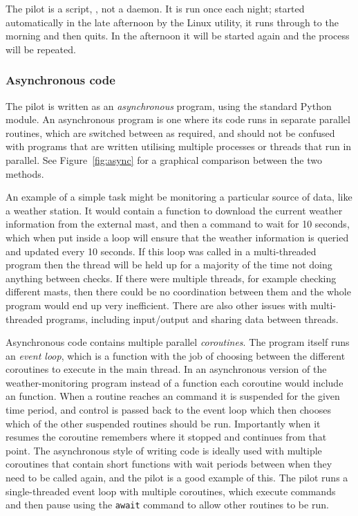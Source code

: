 \begin{colsection}
\begin{colsection}
The pilot is a  script, , not a daemon. It is run once each night; started automatically in the late afternoon by the Linux  utility, it runs through to the morning and then quits. In the afternoon it will be started again and the process will be repeated.

\subsubsection{Asynchronous code}

The pilot is written as an \textit{asynchronous} program, using the standard Python  module. An asynchronous program is one where its code runs in separate parallel routines, which are switched between as required, and should not be confused with programs that are written utilising multiple processes or threads that run in parallel. See Figure~\ref{fig:async} for a graphical comparison between the two methods.

An example of a simple task might be monitoring a particular source of data, like a weather station. It would contain a function to download the current weather information from the external mast, and then a  command to wait for 10 seconds, which when put inside a loop will ensure that the weather information is queried and updated every 10 seconds. If this loop was called in a multi-threaded program then the thread will be held up for a majority of the time not doing anything between checks. If there were multiple threads, for example checking different masts, then there could be no coordination between them and the whole program would end up very inefficient. There are also other issues with multi-threaded programs, including input/output and sharing data between threads.

Asynchronous code contains multiple parallel \textit{coroutines}. The program itself runs an \textit{event loop}, which is a function with the job of choosing between the different coroutines to execute in the main thread. In an asynchronous version of the weather-monitoring program instead of a  function each coroutine would include an  function. When a routine reaches an  command it is suspended for the given time period, and control is passed back to the event loop which then chooses which of the other suspended routines should be run. Importantly when it resumes the coroutine remembers where it stopped and continues from that point. The asynchronous style of writing code is ideally used with multiple coroutines that contain short functions with wait periods between when they need to be called again, and the pilot is a good example of this. The pilot runs a single-threaded event loop with multiple coroutines, which execute commands and then pause using the \texttt{await} command to allow other routines to be run.


\end{colsection}
\end{colsection}
